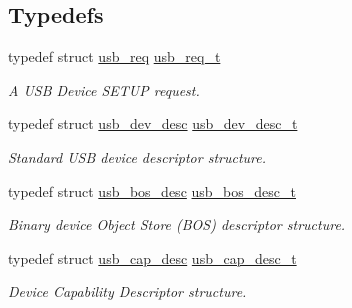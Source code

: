 \subsection*{Typedefs}
\begin{DoxyCompactItemize}
\item 
typedef struct \hyperlink{structusb__req}{usb\+\_\+req} \hyperlink{group__usb__protocol__group_ga2ddc25536c2d827e1ae8d78c479c6308}{usb\+\_\+req\+\_\+t}
\begin{DoxyCompactList}\small\item\em A U\+SB Device S\+E\+T\+UP request. \end{DoxyCompactList}\item 
\mbox{\label{group__usb__protocol__group_ga8975e7719a851c8f7780719d059cb3d3}} 
typedef struct \hyperlink{structusb__dev__desc}{usb\+\_\+dev\+\_\+desc} \hyperlink{group__usb__protocol__group_ga8975e7719a851c8f7780719d059cb3d3}{usb\+\_\+dev\+\_\+desc\+\_\+t}
\begin{DoxyCompactList}\small\item\em Standard U\+SB device descriptor structure. \end{DoxyCompactList}\item 
\mbox{\label{group__usb__protocol__group_gab901a8c0dbb2fc451f4862492a904113}} 
typedef struct \hyperlink{structusb__bos__desc}{usb\+\_\+bos\+\_\+desc} \hyperlink{group__usb__protocol__group_gab901a8c0dbb2fc451f4862492a904113}{usb\+\_\+bos\+\_\+desc\+\_\+t}
\begin{DoxyCompactList}\small\item\em Binary device Object Store (B\+OS) descriptor structure. \end{DoxyCompactList}\item 
\mbox{\label{group__usb__protocol__group_gadb277824f3da4bb3f75a6a345835c438}} 
typedef struct \hyperlink{structusb__cap__desc}{usb\+\_\+cap\+\_\+desc} \hyperlink{group__usb__protocol__group_gadb277824f3da4bb3f75a6a345835c438}{usb\+\_\+cap\+\_\+desc\+\_\+t}
\begin{DoxyCompactList}\small\item\em Device Capability Descriptor structure. \end{DoxyCompactList}\item 
\mbox{\label{group__usb__protocol__group_ga6763c8c797bc5e754f8da2341b163c64}} 

\end{DoxyCompactItemize}
